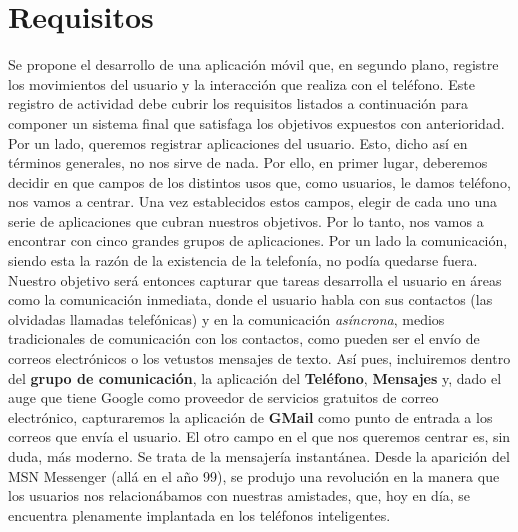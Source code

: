 \documentclass[12pt,a4paper,oneside]{book} %
\begin{document}
\section{Requisitos}
Se propone el desarrollo de una aplicación móvil que, en segundo plano, registre los movimientos del usuario y la interacción que realiza con el teléfono. Este registro de actividad debe cubrir los requisitos listados a continuación para componer un sistema final que satisfaga los objetivos expuestos con anterioridad.
\newline \newline 
Por un lado, queremos registrar aplicaciones del usuario. Esto, dicho así en términos generales, no nos sirve de nada. Por ello, en primer lugar, deberemos decidir en que campos de los distintos usos que, como usuarios, le damos teléfono,  nos vamos a centrar. Una vez establecidos estos campos, elegir de cada uno una serie de aplicaciones que cubran nuestros objetivos. 
\newline \newline 
Por lo tanto, nos vamos a encontrar con cinco grandes grupos de aplicaciones. Por un lado la comunicación, siendo esta la razón de la existencia de la telefonía, no podía quedarse fuera. Nuestro objetivo será entonces capturar que tareas desarrolla el usuario en áreas como la comunicación inmediata, donde el usuario habla con sus contactos (las olvidadas llamadas telefónicas) y en la comunicación \textit{asíncrona}, medios tradicionales de comunicación con los contactos, como pueden ser el envío de correos electrónicos o los vetustos mensajes de texto.  
\newline \newline 
Así pues, incluiremos dentro del \textbf{grupo de comunicación}, la aplicación del \textbf{Teléfono}, \textbf{Mensajes} y, dado el auge que tiene Google como proveedor de servicios gratuitos de correo electrónico, capturaremos la aplicación de \textbf{GMail} como punto de entrada a los correos que envía el usuario. 
\newline \newline 
El otro campo en el que nos queremos centrar es, sin duda, más moderno. Se trata de la mensajería instantánea. Desde la aparición del MSN Messenger (allá en el año 99), se produjo una revolución en la manera que los usuarios nos relacionábamos con nuestras amistades, que, hoy en día, se encuentra plenamente implantada en los teléfonos inteligentes. 
\newline \newline 
\end{document}
